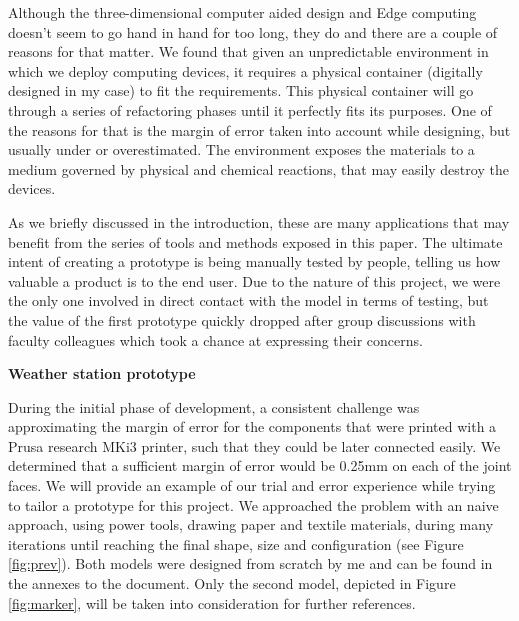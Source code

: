 Although the three-dimensional computer aided design and Edge computing doesn't seem to go hand in hand for too long, they do and there are a couple of reasons for that matter. We found that given an unpredictable environment in which we deploy computing devices, it requires a physical container (digitally designed in my case) to fit the requirements. This physical container will go through a series of refactoring phases until it perfectly fits its purposes. One of the reasons for that is the margin of error taken into account while designing, but usually under or overestimated. The environment exposes the materials to a medium governed by physical and chemical reactions, that may easily destroy the devices. 

As we briefly discussed in the introduction, these are many applications that may benefit from the series of tools and methods exposed in this paper. The ultimate intent of creating a prototype is being manually tested by people, telling us how valuable a product is to the end user. Due to the nature of this project, we were the only one involved in direct contact with the model in terms of testing, but the value of the first prototype quickly dropped after group discussions with faculty colleagues which took a chance at expressing their concerns. 

\vspace{0.4cm}
\textbf{Weather station prototype}
\vspace{0.4cm}

During the initial phase of development, a consistent challenge was approximating the margin of error for the components that were printed with a Prusa research MKi3 printer, such that they could be later connected easily. We determined that a sufficient margin of error would be 0.25mm on each of the joint faces. We will provide an example of our trial and error experience while trying to tailor a prototype for this project. We approached the problem with an naive approach, using power tools, drawing paper and textile materials, during many iterations until reaching the final shape, size and configuration (see Figure \ref{fig:prev}). Both models were designed from scratch by me and can be found in the annexes to the document. Only the second model, depicted in Figure \ref{fig:marker}, will be taken into consideration for further references.

